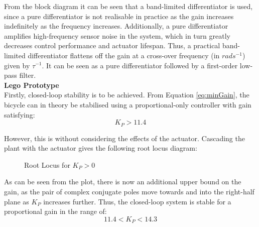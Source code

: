 From the block diagram it can be seen that a band-limited differentiator is used, since a pure differentiator is not realisable in practice as the gain increases indefinitely as the frequency increases. Additionally, a pure differentiator amplifies high-frequency sensor noise in the system, which in turn greatly decreases control performance and actuator lifespan. Thus, a practical band-limited differentiator flattens off the gain at a cross-over frequency (in $rads^{-1}$) given by $\tau^{-1}$. It can be seen as a pure differentiator followed by a first-order low-pass filter. \\

\textbf{Lego Prototype} \\
Firstly, closed-loop stability is to be achieved. From Equation \ref{eq:minGain}, the bicycle can in theory be stabilised using a proportional-only controller with gain satisfying:
\begin{equation*}
K_P > 11.4
\end{equation*}

However, this is without considering the effects of the actuator. Cascading the plant with the actuator gives the following root locus diagram:

\begin{figure}[H]
	\centering
	\caption{Root Locus for $K_P > 0$}
\end{figure}

As can be seen from the plot, there is now an additional upper bound on the gain, as the pair of complex conjugate poles move towards and into the right-half plane as $K_P$ increases further. Thus, the closed-loop system is stable for a proportional gain in the range of:
\begin{equation*}
11.4 < K_P < 14.3
\end{equation*}

